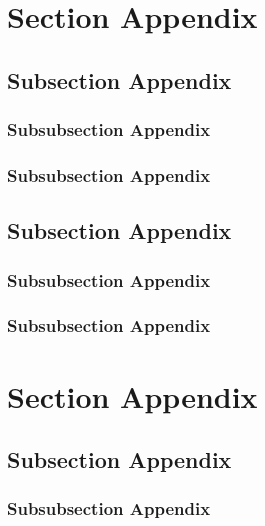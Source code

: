 \section{Section Appendix}

\lipsum[1-3]

\subsection{Subsection Appendix}

\lipsum[1-2]

\subsubsection{Subsubsection Appendix}

\lipsum[1]

\subsubsection{Subsubsection Appendix}

\lipsum[1]

\subsection{Subsection Appendix}

\lipsum[1-2]

\subsubsection{Subsubsection Appendix}

\lipsum[1]

\subsubsection{Subsubsection Appendix}

\lipsum[1]

\section{Section Appendix}

\lipsum[1-3]

\subsection{Subsection Appendix}

\lipsum[1-2]

\subsubsection{Subsubsection Appendix}

